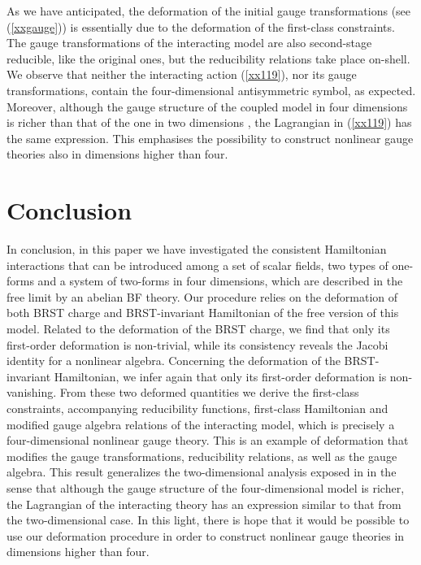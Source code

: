 \documentclass[a4paper,12pt]{article}
\begin{document}
As we have anticipated, the deformation of the initial gauge transformations
(see (\ref{xxgauge})) is essentially due to the deformation of the
first-class constraints. The gauge transformations of the interacting model
are also second-stage reducible, like the original ones, but the
reducibility relations take place on-shell. We observe that neither the
interacting action (\ref{xx119}), nor its gauge transformations, contain the
four-dimensional antisymmetric symbol, as expected. Moreover, although the
gauge structure of the coupled model in four dimensions is richer than that
of the one in two dimensions \cite{mpla}, the Lagrangian in (\ref{xx119})
has the same expression. This emphasises the possibility to construct
nonlinear gauge theories also in dimensions higher than four.

\section{Conclusion}

In conclusion, in this paper we have investigated the consistent Hamiltonian
interactions that can be introduced among a set of scalar fields, two types
of one-forms and a system of two-forms in four dimensions, which are
described in the free limit by an abelian BF theory. Our procedure relies on
the deformation of both BRST charge and BRST-invariant Hamiltonian of the
free version of this model. Related to the deformation of the BRST charge,
we find that only its first-order deformation is non-trivial, while its
consistency reveals the Jacobi identity for a nonlinear algebra. Concerning
the deformation of the BRST-invariant Hamiltonian, we infer again that only
its first-order deformation is non-vanishing. From these two deformed
quantities we derive the first-class constraints, accompanying reducibility
functions, first-class Hamiltonian and modified gauge algebra relations of
the interacting model, which is precisely a four-dimensional nonlinear gauge
theory. This is an example of deformation that modifies the gauge
transformations, reducibility relations, as well as the gauge algebra. This
result generalizes the two-dimensional analysis exposed in \cite{mpla} in
the sense that although the gauge structure of the four-dimensional model is
richer, the Lagrangian of the interacting theory has an expression similar
to that from the two-dimensional case. In this light, there is hope that it
would be possible to use our deformation procedure in order to construct
nonlinear gauge theories in dimensions higher than four.
\end{document}
